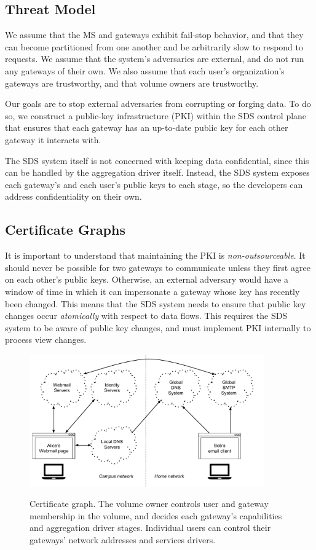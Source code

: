 \subsection{Threat Model}

We assume that the MS and gateways exhibit fail-stop behavior, and that they can
become partitioned from one another and be arbitrarily slow to respond to
requests.  We assume that the system's adversaries are external, and do not run
any gateways of their own.  We also assume that each user's organization's
gateways are trustworthy, and that volume owners are trustworthy.

Our goals are to stop external adversaries from corrupting or forging
data.  To do so, we construct a public-key infrastructure (PKI) within the SDS control
plane that ensures that each gateway has an up-to-date public key for each other
gateway it interacts with.

The SDS system itself is not concerned with keeping data
confidential, since this can be handled by the aggregation driver itself.
Instead, the SDS system exposes each gateway's and each user's public keys to
each stage, so the developers can address confidentiality on their own.

\subsection{Certificate Graphs}

It is important to understand that maintaining the PKI is
\emph{non-outsourceable}.  It should never be possible for two
gateways to communicate unless they first agree on each other's public keys.
Otherwise, an external adversary would have a window of time in which it can
impersonate a gateway whose key has recently been changed.  This means that the
SDS system needs to ensure that public key changes occur \emph{atomically} with respect
to data flows.  This requires the SDS system to be aware of public key changes,
and must implement PKI internally to 
process view changes.

\begin{figure}[h]
   \caption{Certificate graph.  The volume owner controls user and gateway
   membership in the volume, and decides each gateway's capabilities and
   aggregation driver stages.  Individual users can control their gateways'
   network addresses and services drivers.}
   \centering
   \includegraphics[width=0.9\textwidth,page=13]{figures/dissertation-figures}
   \label{fig:chap2-certificate-graph}
\end{figure}

